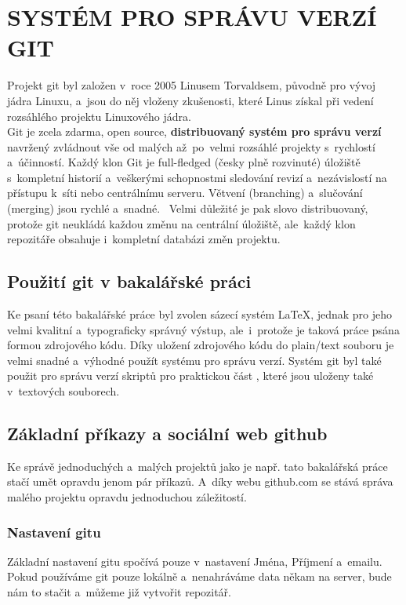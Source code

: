 \documentclass[a4paper,12pt,twoside,BCOR=10mm]{article}
\newcommand{\upc}[1]{\uppercase{#1}} %
\renewcommand{\b}[1]{\textbf{#1}} %
\begin{document}
\section{\upc{Systém pro správu verzí git}}
Projekt git byl založen v~roce 2005 Linusem Torvaldsem, původně pro vývoj jádra Linuxu, a~jsou do něj vloženy zkušenosti, které Linus získal při vedení rozsáhlého projektu Linuxového jádra.~\cite{MailingListVznikGITu}\\

Git je zcela zdarma, open source, \b{distribuovaný systém pro správu verzí} navržený zvládnout vše od malých až~po~velmi rozsáhlé projekty s~rychlostí a~účinností. Každý klon Git je full-fledged (česky plně rozvinuté) úložiště s~kompletní historií a~veškerými schopnostmi sledování revizí a~nezávislostí na přístupu k~síti nebo centrálnímu serveru. Větvení (branching) a~slučování (merging) jsou rychlé a~snadné.~\cite{GITWEB} Velmi důležité je pak slovo distribuovaný, protože git neukládá každou změnu na centrální úložiště, ale~každý klon repozitáře obsahuje i~kompletní databázi změn projektu.

\subsection{Použití git v bakalářské práci}
Ke psaní této bakalářské práce byl zvolen sázecí systém \LaTeX, jednak pro jeho velmi kvalitní a~typograficky správný výstup, ale~i~protože je taková práce psána formou zdrojového kódu. Díky uložení zdrojového kódu do plain/text souboru je velmi snadné a~výhodné použít systému pro správu verzí. Systém git byl také použit pro správu verzí skriptů pro praktickou část , které jsou uloženy také v~textových souborech.

\subsection[Základní příkazy a github]{Základní příkazy a sociální web github}
Ke správě jednoduchých a~malých projektů jako je např. tato bakalářská práce stačí umět opravdu jenom pár příkazů. A~díky webu github.com se stává správa malého projektu opravdu jednoduchou záležitostí.\\

\subsubsection{Nastavení gitu}
Základní nastavení gitu spočívá pouze v~nastavení Jména, Příjmení a~emailu. Pokud používáme git pouze lokálně a~nenahráváme data někam na server, bude nám to stačit a~můžeme již vytvořit repozitář.\\
\end{document}
